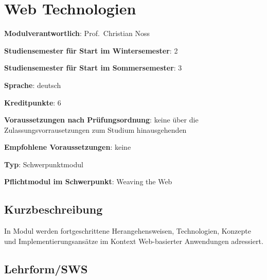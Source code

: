 \chapter{Web
Technologien\label{/mi-2017/modulbeschreibungen-master/MA_WTW_Modul_Web-Technologien}}\label{web-technologienpathlabelmi-2017modulbeschreibungen-mastermaux5fwtwux5fmodulux5fweb-technologien}

\begin{modulHead}
\textbf{Modulverantwortlich}: Prof.~Christian
Noss
\end{modulHead}
\begin{modulHead}
\textbf{Studiensemester für
Start im Wintersemester}:
2
\end{modulHead}
\begin{modulHead}
\textbf{Studiensemester für Start
im Sommersemester}:
3
\end{modulHead}
\begin{modulHead}
\textbf{Sprache}:
deutsch
\end{modulHead}
\begin{modulHead}
\textbf{Kreditpunkte}:
6
\end{modulHead}
\begin{modulHead}
\textbf{Voraussetzungen nach
Prüfungsordnung}: keine über die Zulassungsvorrausetzungen zum Studium
hinausgehenden
\end{modulHead}
\begin{modulHead}
\textbf{Empfohlene
Voraussetzungen}: keine
\end{modulHead}
\begin{modulHead}
\textbf{Typ}:
Schwerpunktmodul
\end{modulHead}
\begin{modulHead}
\textbf{Pflichtmodul
im Schwerpunkt}: Weaving the Web
\end{modulHead}


\section*{Kurzbeschreibung\label{/mi-2017/modulbeschreibungen-master/MA_WTW_Modul_Web-Technologien}}\label{kurzbeschreibungpathlabelmi-2017modulbeschreibungen-mastermaux5fwtwux5fmodulux5fweb-technologien}

In Modul werden fortgeschrittene Herangehensweisen, Technologien,
Konzepte und Implementierungsansätze im Kontext Web-basierter
Anwendungen adressiert.

\section*{Lehrform/SWS\label{/mi-2017/modulbeschreibungen-master/MA_WTW_Modul_Web-Technologien}}\label{lehrformswspathlabelmi-2017modulbeschreibungen-mastermaux5fwtwux5fmodulux5fweb-technologien}

